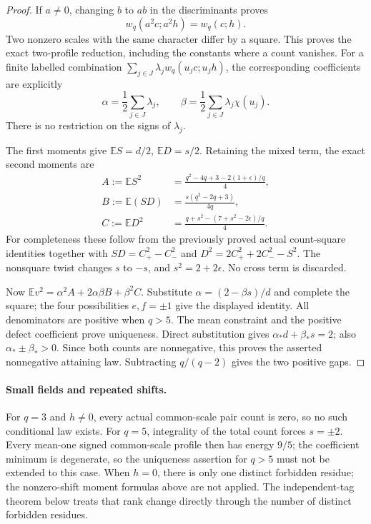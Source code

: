 \documentclass[11pt]{article}
\begin{document}
\begin{proof}
If \(a\ne0\), changing \(b\) to \(ab\) in the discriminants proves
\[
 w_q(a^2c;a^2h)=w_q(c;h).
\]
Two nonzero scales with the same character differ by a square.
This proves the exact two-profile reduction, including the constants
where a count vanishes. For a finite labelled combination
\(\sum_{j\in J}\lambda_jw_q(u_jc;u_jh)\), the corresponding coefficients
are explicitly
\[
 \alpha=\frac12\sum_{j\in J}\lambda_j,\qquad
 \beta=\frac12\sum_{j\in J}\lambda_j\chi(u_j).
\]
There is no restriction on the signs of \(\lambda_j\).

The first moments give
\(\mathbb ES=d/2\), \(\mathbb ED=s/2\).
Retaining the mixed term, the exact second moments are
\begin{align*}
 A:=\mathbb ES^2&=
       \frac{q^2-4q+3-2(1+\epsilon)/q}{4},\\
 B:=\mathbb E(SD)&=\frac{s(q^2-2q+3)}{4q},\\
 C:=\mathbb ED^2&=
       \frac{q+s^2-(7+s^2-2\epsilon)/q}{4}.
\end{align*}
For completeness these follow from the previously proved actual
count-square identities together with
\(SD=C_+^2-C_-^2\) and
\(D^2=2C_+^2+2C_-^2-S^2\).
The nonsquare twist changes \(s\) to \(-s\), and
\(s^2=2+2\epsilon\). No cross term is discarded.

Now
\(\mathbb Ev^2=\alpha^2A+2\alpha\beta B+\beta^2C\).
Substitute \(\alpha=(2-\beta s)/d\) and complete the square;
the four possibilities \(e,f=\pm1\) give the displayed identity.
All denominators are positive when \(q>5\).
The mean constraint and the positive defect coefficient prove
uniqueness. Direct substitution gives
\(\alpha_*d+\beta_*s=2\);
also \(\alpha_*\pm\beta_*>0\).
Since both counts are nonnegative, this proves the asserted
nonnegative attaining law. Subtracting \(q/(q-2)\) gives the two
positive gaps.
\end{proof}

\paragraph{Small fields and repeated shifts.}
For \(q=3\) and \(h\ne0\), every actual common-scale pair count is
zero, so no such conditional law exists.
For \(q=5\), integrality of the total count forces \(s=\pm2\).
Every mean-one signed common-scale profile then has energy \(9/5\);
the coefficient minimum is degenerate, so the uniqueness assertion
for \(q>5\) must not be extended to this case.
When \(h=0\), there is only one distinct forbidden residue; the
nonzero-shift moment formulas above are not applied.
The independent-tag theorem below treats that rank change directly
through the number of distinct forbidden residues.
\end{document}
